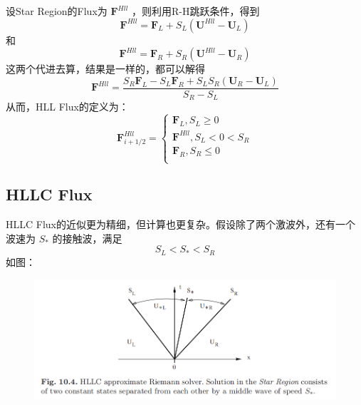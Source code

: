 \documentclass{book}
\begin{document}
设Star Region的Flux为 $\mathbf F^{Hll}$ ，则利用R-H跳跃条件，得到
\begin{equation}
    \mathbf{F}^{Hll}=\mathbf{F}_L+S_L\left( \mathbf{U}^{Hll}-\mathbf{U}_L \right)
\end{equation}
和
\begin{equation}
    \mathbf{F}^{Hll}=\mathbf{F}_R+S_R\left( \mathbf{U}^{Hll}-\mathbf{U}_R \right)
\end{equation}
这两个代进去算，结果是一样的，都可以解得
\begin{equation}
    \displaystyle \mathbf{F}^{Hll}=\frac{S_R\mathbf{F}_L-S_L\mathbf{F}_R+S_LS_R\left( \mathbf{U}_R-\mathbf{U}_L \right)}{S_R-S_L}
\end{equation}
从而，HLL Flux的定义为：
\begin{equation}
    \mathbf{F}_{i+1/2}^{Hll}=\begin{cases}
        \mathbf{F}_L,S_L\ge 0      \\
        \mathbf{F}^{Hll},S_L<0<S_R \\
        \mathbf{F}_R,S_R\le 0      \\
    \end{cases}
\end{equation}





\subsection{HLLC Flux}
HLLC Flux的近似更为精细，但计算也更复杂。假设除了两个激波外，还有一个波速为 $S_*$ 的接触波，满足
\begin{equation}
    S_L<S_*<S_R
\end{equation}
如图：
\begin{figure}[htp]
    \centering
    \label{fig:}
    \includegraphics[width=0.7\linewidth]{fig/HLLC.png}
    \caption{}
\end{figure}
\end{document}
